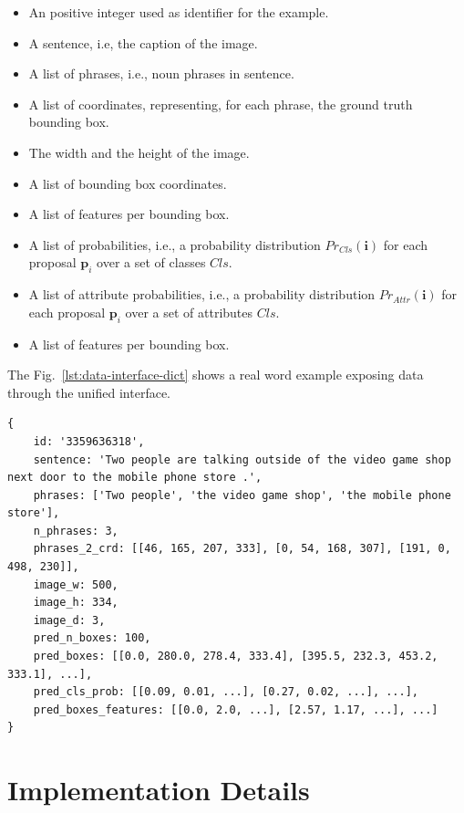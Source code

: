 \begin{itemize}
  \item An positive integer used as identifier for the example.
  \item A sentence, i.e, the caption of the image.
  \item A list of phrases, i.e., noun phrases in sentence.
  \item A list of coordinates, representing, for each phrase, the
  ground truth bounding box.
  \item The width and the height of the image.
  \item A list of bounding box coordinates.
  \item A list of features per bounding box.
  \item A list of probabilities, i.e., a probability distribution
  $Pr_{Cls}(\bm{i})$ for each proposal $\bm{p}_i$ over a set of
  classes $Cls$.
  \item A list of attribute probabilities, i.e., a probability
  distribution $Pr_{Attr}(\bm{i})$ for each proposal $\bm{p}_i$ over a
  set of attributes $Cls$.
  \item A list of features per bounding box.
\end{itemize}

The Fig.~\ref{lst:data-interface-dict} shows a real word example
exposing data through the unified interface.

\begin{lstlisting}[style=simplepython,caption=Example of our data structure for as interface to row data,label={lst:data-interface-dict}]
{
    id: '3359636318', 
    sentence: 'Two people are talking outside of the video game shop next door to the mobile phone store .', 
    phrases: ['Two people', 'the video game shop', 'the mobile phone store'], 
    n_phrases: 3, 
    phrases_2_crd: [[46, 165, 207, 333], [0, 54, 168, 307], [191, 0, 498, 230]], 
    image_w: 500, 
    image_h: 334, 
    image_d: 3, 
    pred_n_boxes: 100, 
    pred_boxes: [[0.0, 280.0, 278.4, 333.4], [395.5, 232.3, 453.2, 333.1], ...], 
    pred_cls_prob: [[0.09, 0.01, ...], [0.27, 0.02, ...], ...],
    pred_boxes_features: [[0.0, 2.0, ...], [2.57, 1.17, ...], ...]
}
\end{lstlisting}

\section{Implementation Details}
\label{sec:impl-details}

